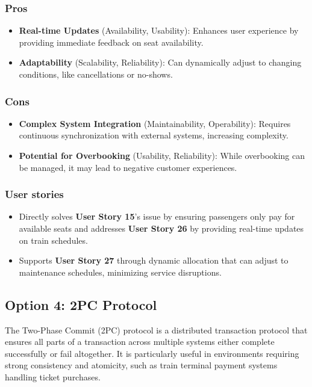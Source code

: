 \subsubsection*{Pros}
\begin{itemize}[noitemsep]
    \item \textbf{Real-time Updates} (Availability, Usability): Enhances user experience by providing immediate feedback on seat availability.
    \item \textbf{Adaptability} (Scalability, Reliability): Can dynamically adjust to changing conditions, like cancellations or no-shows.
\end{itemize}
\subsubsection*{Cons}
\begin{itemize}[noitemsep]
    \item \textbf{Complex System Integration} (Maintainability, Operability): Requires continuous synchronization with external systems, increasing complexity.
    \item \textbf{Potential for Overbooking} (Usability, Reliability): While overbooking can be managed, it may lead to negative customer experiences.
\end{itemize}
\subsubsection*{User stories}
\begin{itemize}
    \item Directly solves \textbf{User Story 15}'s issue by ensuring passengers only pay for available seats and addresses \textbf{User Story 26} by providing real-time updates on train schedules.
    \item Supports \textbf{User Story 27} through dynamic allocation that can adjust to maintenance schedules, minimizing service disruptions.
\end{itemize}

\subsection*{Option 4: 2PC Protocol}
The Two-Phase Commit (2PC) protocol is a distributed transaction protocol that ensures all parts of a transaction across multiple systems either complete successfully or fail altogether. It is particularly useful in environments requiring strong consistency and atomicity, such as train terminal payment systems handling ticket purchases.

